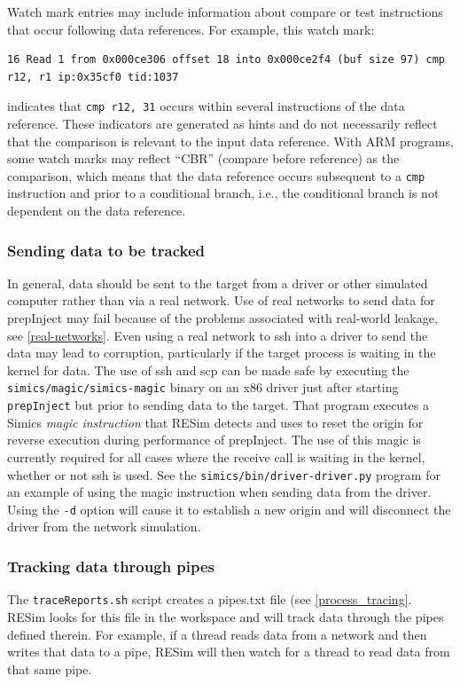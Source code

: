 \documentclass[titlepage]{article}
\begin{document}
Watch mark entries may include information about compare or test instructions that occur following data references.  For example, this watch mark:

\begin{verbatim}
16 Read 1 from 0x000ce306 offset 18 into 0x000ce2f4 (buf size 97) cmp r12, r1 ip:0x35cf0 tid:1037
\end{verbatim}
\noindent indicates that {\tt cmp r12, 31} occurs within several instructions of the data reference.  These indicators are generated as hints and do not necessarily reflect
that the comparison is relevant to the input data reference.  With ARM programs, some watch marks may reflect ``CBR'' (compare before reference) as the comparison, 
which means that the data reference occurs subsequent to a {\tt cmp} instruction and prior to a conditional branch, i.e., the conditional branch is not dependent on the data reference.

\subsubsection{Sending data to be tracked}
In general, data should be sent to the target from a driver or other simulated computer rather than via a real network.  Use of real networks to
send data for prepInject may fail because of the problems associated with real-world leakage, see \ref{real-networks}.
Even using a real network to ssh into a driver to send the data may lead to corruption, particularly if the target process is waiting in the 
kernel for data.  The use of ssh and scp can be made safe by executing the {\tt simics/magic/simics-magic} binary on an x86 driver just after
starting {\tt prepInject} but prior to sending data to the target.  That program executes a Simics \textit{magic instruction} that RESim 
detects and uses to reset the origin for reverse execution during performance of prepInject.  The use of this magic is currently required for all
cases where the receive call is waiting in the kernel, whether or not ssh is used.  See the {\tt simics/bin/driver-driver.py} program for an example
of using the magic instruction when sending data from the driver.  Using the {\tt -d} option will cause it to establish a new origin and will disconnect
the driver from the network simulation.

\subsubsection{Tracking data through pipes}
The {\tt traceReports.sh} script creates a pipes.txt file (see \ref{process_tracing}.   RESim looks for this file in the workspace and will track data through the
pipes defined therein.  For example, if a thread reads data from a network and then writes that data to a pipe, RESim will then watch for a thread
to read data from that same pipe.
\end{document}
